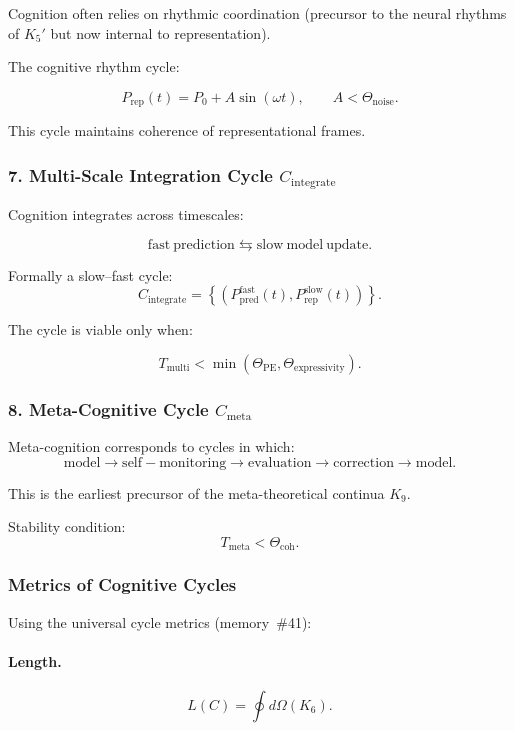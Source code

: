 Cognition often relies on rhythmic coordination (precursor to the
neural rhythms of $K_5'$ but now internal to representation).

The cognitive rhythm cycle:

\[
 P_{\mathrm{rep}}(t) = P_0 + A\sin(\omega t),\qquad
 A < \Theta_{\mathrm{noise}}.
\]

This cycle maintains coherence of representational frames.

\subsubsection{7. Multi-Scale Integration Cycle $C_{\mathrm{integrate}}$}

Cognition integrates across timescales:

\[
 \mathrm{fast\ prediction}
 \leftrightarrows
 \mathrm{slow\ model\ update}.
\]

Formally a slow–fast cycle:
\[
 C_{\mathrm{integrate}} =
 \left\{
   (P_{\mathrm{pred}}^{\mathrm{fast}}(t),
    P_{\mathrm{rep}}^{\mathrm{slow}}(t))
 \right\}.
\]

The cycle is viable only when:

\[
 T_{\mathrm{multi}} < \min(\Theta_{\mathrm{PE}},\Theta_{\mathrm{expressivity}}).
\]

\subsubsection{8. Meta-Cognitive Cycle $C_{\mathrm{meta}}$}

Meta-cognition corresponds to cycles in which:
\[
 \mathrm{model}
 \to 
 \mathrm{self-monitoring}
 \to
 \mathrm{evaluation}
 \to
 \mathrm{correction}
 \to
 \mathrm{model}.
\]

This is the earliest precursor of the meta-theoretical continua $K_9$.

Stability condition:
\[
 T_{\mathrm{meta}} < \Theta_{\mathrm{coh}}.
\]

\subsubsection{Metrics of Cognitive Cycles}

Using the universal cycle metrics (memory~\#41):

\paragraph{Length.}
\[
  L(C)=\oint d\Omega(K_6).
\]

